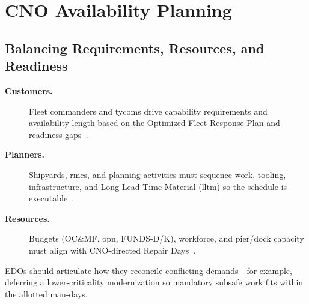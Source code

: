 \documentclass[../main.tex]{subfiles}
\begin{document}
\section{CNO Availability Planning}
\minibib

\subsection{Balancing Requirements, Resources, and Readiness}
\begin{description}
\item[\textbf{Customers.}] Fleet commanders and \ac{tycom}s drive capability requirements and availability length based on the Optimized Fleet Response Plan and readiness gaps~\autocite{OPNAVINST3000-15K,edo-4-2-1-cno-availability-planning-2025}.
\item[\textbf{Planners.}] Shipyards, \acp{rmc}, and planning activities must sequence work, tooling, infrastructure, and Long-Lead Time Material (\ac{lltm}) so the schedule is executable~\autocite{edo-4-2-1-cno-availability-planning-2025}.
\item[\textbf{Resources.}] Budgets (OC\&MF, \ac{opn}, FUNDS-D/K), workforce, and pier/dock capacity must align with CNO-directed Repair Days~\autocite{OPNAVNOTE4700-24}.
\end{description}
EDOs should articulate how they reconcile conflicting demands—for example, deferring a lower-criticality modernization so mandatory \ac{subsafe} work fits within the allotted man-days.
\end{document}

